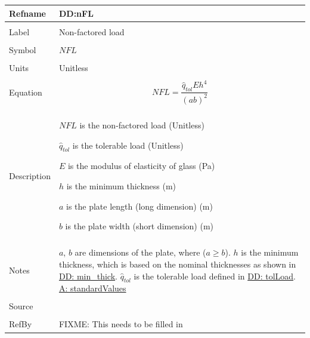 \documentclass[12pt]{article}
\begin{document}
\noindent \begin{minipage}{\textwidth}
\begin{tabular}{p{} p{}}
\toprule \textbf{Refname} & \textbf{DD:nFL}
\label{DD:nFL}
\\ \midrule \\
Label & Non-factored load
\\ \midrule \\
Symbol & $NFL$
\\ \midrule \\
Units & Unitless
\\ \midrule \\
Equation & \begin{dmath}
           NFL=\frac{{\hat{q}_{tol}} E h^{4}}{\left(a b\right)^{2}}
           \end{dmath}
\\ \midrule \\
Description & \begin{symbDescription}
              \item{$NFL$ is the non-factored load (Unitless)}
              \item{${\hat{q}_{tol}}$ is the tolerable load (Unitless)}
              \item{$E$ is the modulus of elasticity of glass (Pa)}
              \item{$h$ is the minimum thickness (m)}
              \item{$a$ is the plate length (long dimension) (m)}
              \item{$b$ is the plate width (short dimension) (m)}
              \end{symbDescription}
\\ \midrule \\
Notes & $a$, $b$ are dimensions of the plate, where ($a\geq{}b$).
        $h$ is the minimum thickness, which is based on the nominal thicknesses as shown in \hyperref[DD:min.thick]{DD: min\_thick}.
        ${\hat{q}_{tol}}$ is the tolerable load defined in \hyperref[DD:tolLoad]{DD: tolLoad}.
        \hyperref[A:standardValues]{A: standardValues}
\\ \midrule \\
Source & \cite{astm2009}
\\ \midrule \\
RefBy & FIXME: This needs to be filled in
\\ \bottomrule \end{tabular}
\end{minipage}\\
\end{document}

